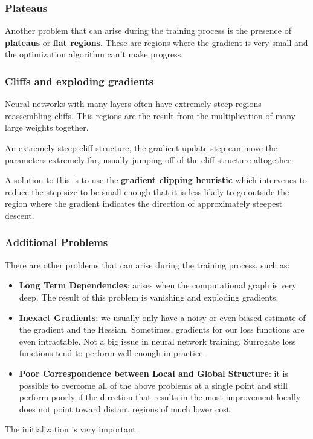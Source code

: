 \subsubsection{Plateaus}
Another problem that can arise during the training process is the presence of
\textbf{plateaus} or \textbf{flat regions}. These are regions where the gradient
is very small and the optimization algorithm can't make progress.
\subsubsection{Cliffs and exploding gradients}
Neural networks with many layers often have extremely steep regions reassembling
cliffs. This regions are the result from the multiplication of many large weights
together.

An extremely steep cliff structure, the gradient update step can move the
parameters extremely far, usually jumping off of the cliff structure altogether.

A solution to this is to use the \textbf{gradient clipping heuristic} which
intervenes to reduce the step size to be small enough that it is less likely to
go outside the region where the gradient indicates the direction of approximately
steepest descent.
\subsubsection{Additional Problems}
There are other problems that can arise during the training process, such as:
\begin{itemize}
    \item \textbf{Long Term Dependencies}: arises when the computational graph
          is very deep. The result of this problem is vanishing and exploding
          gradients.
    \item \textbf{Inexact Gradients}: we usually only have a noisy or even biased
          estimate of the gradient and the Hessian. Sometimes, gradients for our
          loss functions are even intractable. Not a big issue in neural network
          training. Surrogate loss functions tend to perform well enough in practice.
    \item \textbf{Poor Correspondence between Local and Global Structure}: it is
          possible to overcome all of the above problems at a single point and
          still perform poorly if the direction that results in the most
          improvement locally does not point toward distant regions of much
          lower cost.
\end{itemize}
\begin{note}
    The initialization is very important.
\end{note}
